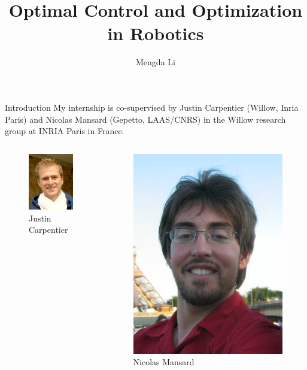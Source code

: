 \documentclass{beamer}
\title{Optimal Control and Optimization in Robotics}
\author{Mengda Li}
\institute{ENS Paris-Saclay}
\begin{document}
\begin{frame}
\titlepage
\end{frame}



\begin{frame}{Introduction}
My internship is co-supervised by Justin Carpentier (Willow, Inria Paris) and Nicolas Mansard (Gepetto, LAAS/CNRS) in the Willow research group at INRIA Paris in France. 


\begin{columns}
\begin{figure}
\includegraphics[scale=0.35]{images/Justin_Carpentier.jpg}
\caption{Justin Carpentier}
\end{figure}
\begin{figure}
\includegraphics[scale=0.1]{images/Nicolas_Mansard.jpg}
\caption{Nicolas Mansard}
\end{figure}
\end{columns}

\end{frame}
\end{document}
